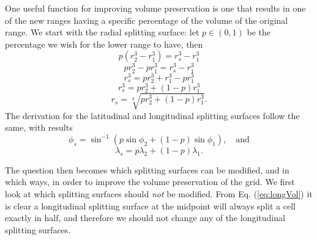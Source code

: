 One useful function for improving volume preservation is one that results in one of the new ranges having a specific percentage of the volume of the original range. We start with the radial splitting surface: let $p \in (0,1)$ be the percentage we wish for the lower range to have, then
%
\begin{equation*}
p \left( r_{2}^{3} - r_{1}^{3} \right) = r_{s}^{3} - r_{1}^{3}
\end{equation*}%
%
\begin{equation*}
p r_{2}^{3} - p r_{1}^{3} = r_{s}^{3} - r_{1}^{3}
\end{equation*}%
%
\begin{equation*}
r_{s}^{3} = p r_{2}^{3} + r_{1}^{3} - p r_{1}^{3}
\end{equation*}%
%
\begin{equation*}
r_{s}^{3} = p r_{2}^{3} + \left( 1 - p \right) r_{1}^{3}
\end{equation*}%
%
\begin{equation} \label{eq:radVol}
r_{s} = \sqrt[3]{ p r_{2}^{3} + \left( 1 - p \right) r_{1}^{3} }.
\end{equation}%
%
The derivation for the latitudinal and longitudinal splitting surfaces follow the same, with results
%
\begin{equation} \label{eq:latVol}
\phi_{s} = \sin^{-1} \left( p \sin\phi_{2} + \left( 1 - p \right) \sin\phi_{1} \right), \quad\text{and}
\end{equation}%
%
\begin{equation} \label{eq:longVol}
\lambda_{s} = p \lambda_{2} + \left( 1 - p \right) \lambda_{1}.
\end{equation}%
%

The question then becomes which splitting surfaces can be modified, and in which ways, in order to improve the volume preservation of the grid. We first look at which splitting surfaces should \textit{not} be modified. From Eq. (\ref{eq:longVol}) it is clear a longitudinal splitting surface at the midpoint will always split a cell exactly in half, and therefore we should not change any of the longitudinal splitting surfaces. 



